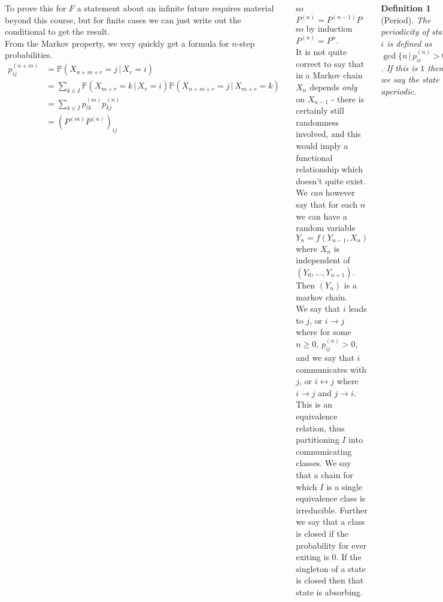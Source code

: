 \documentclass{tikzposter} %
\newtheorem{definition}{Definition}
\begin{document}
\begin{columns}
{  To prove this for $F$ a statement about an infinite future requires material beyond this course, but for finite cases we can just write out the conditional to get the result. \\

  From the Markov property, we very quickly get a formula for $n$-step probabilities. \\

  \begin{align*}
    p_{ij}^{(n+m)} &= \mathbb{P}(X_{n+m+r} = j \,|\, X_{r} = i) \\
                  &= \sum_{k \in I} \mathbb{P}(X_{m+r} = k \,|\, X_{r} = i) \mathbb{P}(X_{n+m+r} = j \,|\, X_{m+r} = k) \\
                  &= \sum_{k \in I} p^{(m)}_{ik} p^{(n)}_{kj} \\
    &= (P^{(m)}P^{(n)})_{ij}
  \end{align*}

  so $P^{(n)} = P^{(n-1)}P$ so by induction $P^{(n)} = P^{n}$. \\

  It is not quite correct to say that in a Markov chain $X_{n}$ depends \emph{only} on $X_{n-1}$ - there is certainly still randomness involved, and this would imply a functional relationship which doesn't quite exist. We \emph{can} however say that for each $n$ we can have a random variable $Y_{n} = f(Y_{n-1}, X_{n})$ where $X_{n}$ is independent of $(Y_{0},\dots, Y_{n+1})$. Then $(Y_{n})$ is a markov chain. \\

  We say that $i$ leads to $j$, or $i \to j$ where for some $n \ge 0$, $p^{(n)}_{ij} > 0$, and we say that $i$ communicates with $j$, or $i \leftrightarrow j$ where $i \to j$ and $j \to i$. This is an equivalence relation, thus partitioning $I$ into communicating classes. We say that a chain for which $I$ is a single equivalence class is irreducible. Further we say that a class is closed if the probability for ever exiting is $0$. If the singleton of a state is closed then that state is absorbing. \\

  \begin{definition}[Period]
    The periodicity of state $i$ is defined as $\gcd \{ n \,|\, p^{(n)}_{ii} > 0\}$. If this is $1$ then we say the state is aperiodic.
  \end{definition}
  \hphantom{}

  All states within the same communicating class have the same period. To see this note that if $i$ and $j$ communicate, then we can get $a$, $b$ such that $p^{(a)}_{ij} > 0$ and $p^{(b)}_{ji} > 0$, so $p^{(a+b)}_{ii} > 0$. Further, if $p^{(m)}_{jj} > 0$, then $p^{(a+b+m)}_{ii} > 0$. Thus if $i$ has period $d$, then $d \,|\, a+b+m$ and $d \,|\, a+b$, so $d \,|\, m$. Thus the period of $i$ divides the period of $j$, and by symmetry thus the reverse holds, so the period of $i$ is equal to the period of $j$. \\

}
\end{columns}
\end{document}
